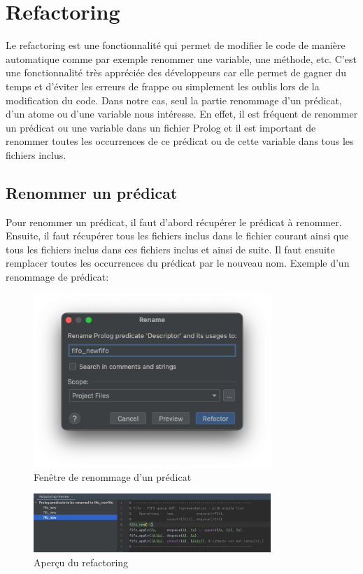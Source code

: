 \section{Refactoring}
\noindent Le refactoring est une fonctionnalité qui permet de modifier le code de manière automatique comme par exemple renommer une variable, une méthode, etc.
C'est une fonctionnalité très appréciée des développeurs car elle permet de gagner du temps et d'éviter les erreurs de frappe ou simplement les oublis lors de la modification du code.
\newdoubleline
Dans notre cas, seul la partie renommage d'un prédicat, d'un atome ou d'une variable nous intéresse.
En effet, il est fréquent de renommer un prédicat ou une variable dans un fichier Prolog et il est important de renommer
toutes les occurrences de ce prédicat ou de cette variable dans tous les fichiers inclus.

\subsection{Renommer un prédicat}
\noindent Pour renommer un prédicat, il faut d'abord récupérer le prédicat à renommer.
Ensuite, il faut récupérer tous les fichiers inclus dans le fichier courant ainsi que tous les fichiers inclus dans ces
fichiers inclus et ainsi de suite.
\newdoubleline
Il faut ensuite remplacer toutes les occurrences du prédicat par le nouveau nom.
\newdoubleline Exemple d'un renommage de prédicat:

\begin{figure}[H]
    \centering
    \includegraphics[width=0.8\textwidth]{images/Refactor_window.png}
    \caption{Fenêtre de renommage d'un prédicat}
    \label{fig:refactor_window}
\end{figure}

\begin{figure}[H]
    \centering
    \includegraphics[width=0.8\textwidth]{images/Refactoring_preview.png}
    \caption{Aperçu du refactoring}
    \label{fig:refactor_preview}
\end{figure}

